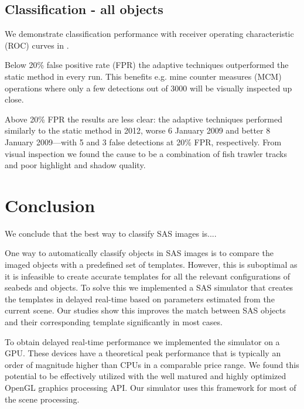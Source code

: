 \subsection{Classification - all objects}

We demonstrate classification performance with receiver operating characteristic (ROC) curves in . 

Below 20\% false positive rate (FPR) the adaptive techniques outperformed the static method in every run. This benefits e.g. mine counter measures (MCM) operations where only a few detections out of 3000 will be visually inspected up close.

Above 20\% FPR the results are less clear: the adaptive techniques performed similarly to the static method in 2012, worse 6 January 2009 and better 8 January 2009---with 5 and 3 false detections at 20\% FPR, respectively. From visual inspection we found the cause to be a combination of fish trawler tracks and poor highlight and shadow quality.



\section{Conclusion}\label{IV_conclusion}


We conclude that the best way to classify SAS images is....

One way to automatically classify objects in SAS images is to compare the imaged objects with a predefined set of templates. However, this is suboptimal as it is infeasible to create accurate templates for all the relevant configurations of seabeds and objects. To solve this we implemented a SAS simulator that creates the templates in delayed real-time based on parameters estimated from the current scene. Our studies show this improves the match between SAS objects and their corresponding template significantly in most cases.

To obtain delayed real-time performance we implemented the simulator on a GPU. These devices have a theoretical peak performance that is typically an order of magnitude higher than CPUs in a comparable price range. We found this potential to be effectively utilized with the well matured and highly optimized OpenGL graphics processing API. Our simulator uses this framework for most of the scene processing.

